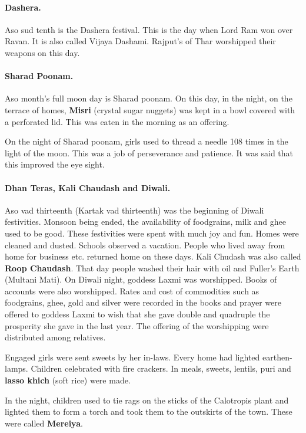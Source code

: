 \paragraph{Dashera.} Aso sud tenth is the Dashera festival. This is the day when
Lord Ram won over Ravan. It is also called Vijaya Dashami. Rajput's of Thar
worshipped their weapons on this day.
\paragraph{Sharad Poonam.} Aso month's full moon day is Sharad poonam. On this
day, in the night, on the terrace of homes, \textbf{Misri} (crystal sugar
nuggets) was kept in a bowl covered with a perforated lid. This was eaten in the
morning as an offering.

On the night of Sharad poonam, girls used to thread a needle 108 times in the
light of the moon. This was a job of perseverance and patience. It was said that
this improved the eye sight.
\paragraph{Dhan Teras, Kali Chaudash and Diwali.} Aso vad thirteenth (Kartak vad
thirteenth) was the beginning of Diwali festivities. Monsoon being ended, the
availability of foodgrains, milk and ghee used to be good. These festivities
were spent with much joy and fun. Homes were cleaned and dusted. Schools
observed a vacation. People who lived away from home for business etc. returned
home on these days. Kali Chudash was also called \textbf{Roop Chaudash}. That
day people washed their hair with oil and Fuller's Earth (Multani Mati). On Diwali
night, goddess Laxmi was worshipped. Books of accounts were also worshipped.
Rates and cost of commodities such as foodgrains, ghee, gold and silver were
recorded in the books and prayer were offered to goddess Laxmi to wish that she
gave double and quadruple the prosperity she gave in the last year. The offering
of the worshipping were distributed among relatives.

Engaged girls were sent sweets by her in-laws. Every home had lighted
earthen-lamps. Children celebrated with fire crackers. In meals, sweets,
lentils, puri and \textbf{lasso khich} (soft rice) were made.

In the night, children used to tie rags on the sticks of the Calotropis plant
and lighted them to form a torch and took them to the outskirts of the town.
These were called \textbf{Mereiya}.

